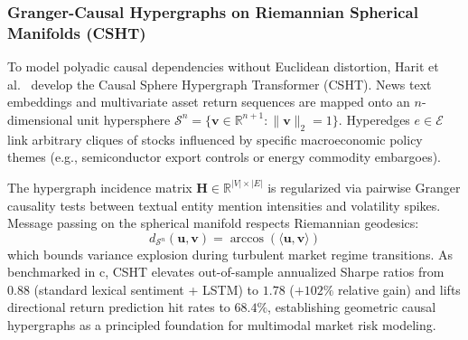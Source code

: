 \subsubsection{Granger-Causal Hypergraphs on Riemannian Spherical Manifolds (CSHT)}
To model polyadic causal dependencies without Euclidean distortion, Harit et al.~\cite{Harit2025CSHT} develop the Causal Sphere Hypergraph Transformer (CSHT). News text embeddings and multivariate asset return sequences are mapped onto an $n$-dimensional unit hypersphere $\mathcal{S}^n = \{ \mathbf{v} \in \mathbb{R}^{n+1} : \|\mathbf{v}\|_2 = 1 \}$. Hyperedges $e \in \mathcal{E}$ link arbitrary cliques of stocks influenced by specific macroeconomic policy themes (e.g., semiconductor export controls or energy commodity embargoes).

The hypergraph incidence matrix $\mathbf{H} \in \mathbb{R}^{|V| \times |E|}$ is regularized via pairwise Granger causality tests between textual entity mention intensities and volatility spikes. Message passing on the spherical manifold respects Riemannian geodesics:
\begin{equation}
    d_{\mathcal{S}^n}(\mathbf{u}, \mathbf{v}) = \arccos(\langle \mathbf{u}, \mathbf{v} \rangle)
\end{equation}
which bounds variance explosion during turbulent market regime transitions. As benchmarked in c, CSHT elevates out-of-sample annualized Sharpe ratios from $0.88$ (standard lexical sentiment + LSTM) to $1.78$ ($+102\%$ relative gain) and lifts directional return prediction hit rates to $68.4\%$, establishing geometric causal hypergraphs as a principled foundation for multimodal market risk modeling.

